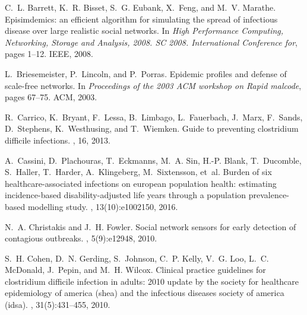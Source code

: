 \documentclass[10pt,letterpaper]{article}
\begin{document}


\nolinenumbers

%
%
% 
%
%

\begin{thebibliography}{}

C.~L. Barrett, K.~R. Bisset, S.~G. Eubank, X.~Feng, and M.~V. Marathe.
\newblock Episimdemics: an efficient algorithm for simulating the spread of
  infectious disease over large realistic social networks.
\newblock In {\em High Performance Computing, Networking, Storage and Analysis,
  2008. SC 2008. International Conference for}, pages 1--12. IEEE, 2008.

L.~Briesemeister, P.~Lincoln, and P.~Porras.
\newblock Epidemic profiles and defense of scale-free networks.
\newblock In {\em Proceedings of the 2003 ACM workshop on Rapid malcode}, pages
  67--75. ACM, 2003.

R.~Carrico, K.~Bryant, F.~Lessa, B.~Limbago, L.~Fauerbach, J.~Marx, F.~Sands,
  D.~Stephens, K.~Westhusing, and T.~Wiemken.
\newblock Guide to preventing clostridium difficile infections.
, 16, 2013.

A.~Cassini, D.~Plachouras, T.~Eckmanns, M.~A. Sin, H.-P. Blank, T.~Ducomble,
  S.~Haller, T.~Harder, A.~Klingeberg, M.~Sixtensson, et~al.
\newblock Burden of six healthcare-associated infections on european population
  health: estimating incidence-based disability-adjusted life years through a
  population prevalence-based modelling study.
, 13(10):e1002150, 2016.

N.~A. Christakis and J.~H. Fowler.
\newblock Social network sensors for early detection of contagious outbreaks.
, 5(9):e12948, 2010.

S.~H. Cohen, D.~N. Gerding, S.~Johnson, C.~P. Kelly, V.~G. Loo, L.~C. McDonald,
  J.~Pepin, and M.~H. Wilcox.
\newblock Clinical practice guidelines for clostridium difficile infection in
  adults: 2010 update by the society for healthcare epidemiology of america
  (shea) and the infectious diseases society of america (idsa).
, 31(5):431--455,
  2010.


\end{thebibliography}
\end{document}
